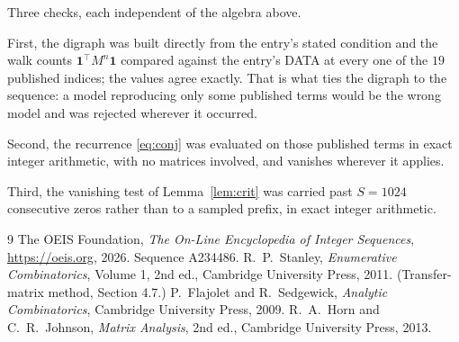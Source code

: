 \documentclass[11pt,a4paper]{article}
\theoremstyle{plain}
\theoremstyle{definition}
\begin{document}
Three checks, each independent of the algebra above.

First, the digraph was built directly from the entry's stated condition and the walk counts
$\mathbf{1}^{\!\top}M^{n}\mathbf{1}$ compared against the entry's DATA at every one of
the $19$ published indices; the values agree exactly. That is what ties the digraph to
the sequence: a model reproducing only some published terms would be the wrong model and
was rejected wherever it occurred.

Second, the recurrence \eqref{eq:conj} was evaluated on those published terms in exact
integer arithmetic, with no matrices involved, and vanishes wherever it applies.

Third, the vanishing test of Lemma~\ref{lem:crit} was carried past $S=1024$ consecutive
zeros rather than to a sampled prefix, in exact integer arithmetic.

\begin{thebibliography}{9}
 The OEIS Foundation, \emph{The On-Line Encyclopedia of Integer
Sequences}, \url{https://oeis.org}, 2026. Sequence A234486.
 R.~P.~Stanley, \emph{Enumerative Combinatorics}, Volume 1, 2nd ed.,
Cambridge University Press, 2011. (Transfer-matrix method, Section 4.7.)
 P.~Flajolet and R.~Sedgewick, \emph{Analytic Combinatorics}, Cambridge
University Press, 2009.
 R.~A.~Horn and C.~R.~Johnson, \emph{Matrix Analysis}, 2nd ed., Cambridge
University Press, 2013.
\end{thebibliography}
\end{document}

